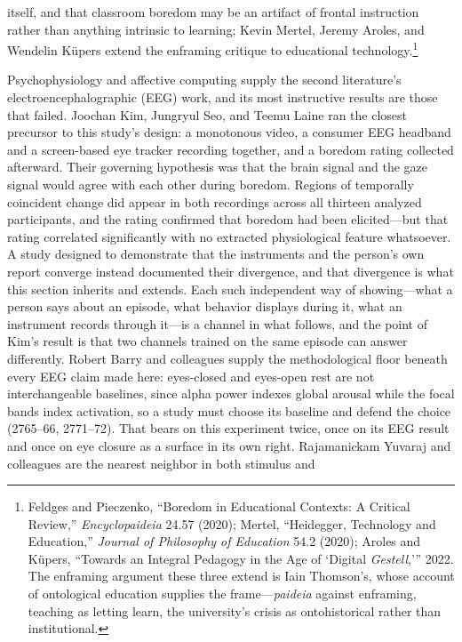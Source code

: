 itself, and that classroom boredom may be an artifact of frontal instruction rather than
anything intrinsic to learning; Kevin Mertel, Jeremy Aroles, and Wendelin Küpers extend the
enframing critique to educational technology.\footnote{Feldges and Pieczenko, ``Boredom in
Educational Contexts: A Critical Review,'' \textit{Encyclopaideia} 24.57 (2020); Mertel,
``Heidegger, Technology and Education,'' \textit{Journal of Philosophy of Education} 54.2
(2020); Aroles and K\"upers, ``Towards an Integral Pedagogy in the Age of `Digital
\textit{Gestell},''' 2022. The enframing argument these three extend is Iain Thomson's, whose
account of ontological education supplies the frame---\textit{paideia} against enframing,
teaching as letting learn, the university's crisis as ontohistorical rather than
institutional.}

Psychophysiology and affective computing supply the second literature's electroencephalographic
(EEG) work, and its most instructive results are those that failed. Joochan Kim, Jungryul Seo,
and Teemu Laine ran the closest precursor to this study's design: a monotonous video, a
consumer EEG headband and a screen-based eye tracker recording together, and a boredom rating
collected afterward. Their governing hypothesis was that the brain signal and the gaze signal
would agree with each other during boredom. Regions of temporally coincident change did appear
in both recordings across all thirteen analyzed participants, and the rating confirmed that
boredom had been elicited---but that rating correlated significantly with no extracted
physiological feature whatsoever. A study designed to demonstrate that the instruments and the
person's own report converge instead documented their divergence, and that divergence is what
this section inherits and extends. Each such independent way of showing---what a person says
about an episode, what behavior displays during it, what an instrument records through it---is
a channel in what follows, and the point of Kim's result is that two channels trained on the
same episode can answer differently. Robert Barry and colleagues supply the methodological
floor beneath every EEG claim made here: eyes-closed and eyes-open rest are not interchangeable
baselines, since alpha power indexes global arousal while the focal bands index activation, so
a study must choose its baseline and defend the choice (2765--66, 2771--72). That bears on
this experiment twice, once on its EEG result and once on eye closure as a surface in its own
right. Rajamanickam Yuvaraj and colleagues are the nearest neighbor in both stimulus and
